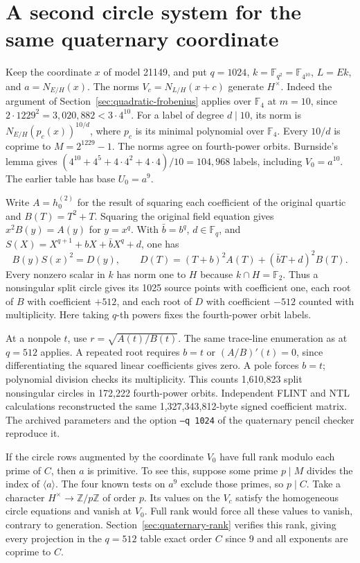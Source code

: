 \documentclass[11pt]{article}
\newcommand{\F}{\mathbb F_2}
\begin{document}
\section{A second circle system for the same quaternary coordinate}
\label{sec:quaternary-doubled}
Keep the coordinate \(x\) of model 21149, and put \(q=1024\),
\(k=\mathbb F_{q^2}=\mathbb F_{4^{10}}\), \(L=Ek\), and \(a=N_{E/H}(x)\).
The norms \(V_c=N_{L/H}(x+c)\) generate \(H^\times\). Indeed the argument
of Section~\ref{sec:quadratic-frobenius} applies over \(\mathbb F_4\)
at \(m=10\), since \(2\cdot1229^2=3{,}020{,}882<3\cdot4^{10}\).
For a label of degree \(d\mid10\), its norm is
\(N_{E/H}(p_c(x))^{10/d}\), where \(p_c\) is its minimal polynomial
over \(\mathbb F_4\). Every \(10/d\) is coprime to \(M=2^{1229}-1\).
The norms agree on fourth-power orbits. Burnside's lemma gives
\((4^{10}+4^5+4\cdot4^2+4\cdot4)/10=104{,}968\) labels, including
\(V_0=a^{10}\). The earlier table has base \(U_0=a^9\).

Write \(A=h_0^{(2)}\) for the result of squaring each coefficient
of the original quartic and \(B(T)=T^2+T\). Squaring the original
field equation gives \(x^2B(y)=A(y)\) for \(y=x^q\). With
\(\bar b=b^q\), \(d\in\mathbb F_q\), and \(S(X)=X^{q+1}+bX+\bar b X^q+d\),
one has
\[
 B(y)S(x)^2=D(y),\qquad
 D(T)=(T+b)^2 A(T)+(\bar b T+d)^2B(T).
\]
Every nonzero scalar in \(k\) has norm one to \(H\) because \(k\cap H=\F\).
Thus a nonsingular split circle gives its 1025 source points with
coefficient one, each root of \(B\) with coefficient \(+512\), and
each root of \(D\) with coefficient \(-512\) counted with multiplicity.
Here taking \(q\)-th powers fixes the fourth-power orbit labels.

At a nonpole \(t\), use \(r=\sqrt{A(t)/B(t)}\). The same trace-line
enumeration as at \(q=512\) applies. A repeated root requires \(b=t\)
or \((A/B)'(t)=0\), since differentiating the squared linear
coefficients gives zero. A pole forces \(b=t\); polynomial division
checks its multiplicity. This counts 1,610,823 split nonsingular circles
in 172,222 fourth-power orbits. Independent FLINT and NTL calculations
reconstructed the same 1,327,343,812-byte signed coefficient matrix.
The archived parameters and the option \texttt{--q 1024} of the
quaternary pencil checker reproduce it.

If the circle rows augmented by the coordinate \(V_0\) have full
rank modulo each prime of \(C\), then \(a\) is primitive. To see this,
suppose some prime \(p\mid M\) divides the index of \(\langle a\rangle\).
The four known tests on \(a^9\) exclude those primes, so \(p\mid C\).
Take a character \(H^\times\to\mathbb Z/p\mathbb Z\) of order \(p\).
Its values on the \(V_c\) satisfy the homogeneous circle equations
and vanish at \(V_0\). Full rank would force all these values to
vanish, contrary to generation. Section~\ref{sec:quaternary-rank}
verifies this rank, giving every projection in the \(q=512\) table
exact order \(C\) since \(9\) and all exponents are coprime to \(C\).
\end{document}
